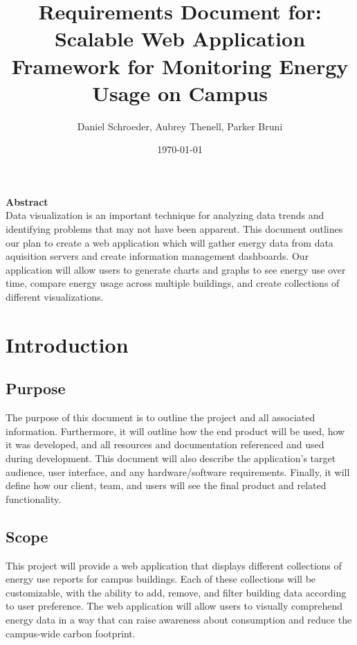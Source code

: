 \documentclass[journal,10pt,onecolumn,compsoc]{IEEEtran}
\title{Requirements Document for: \linebreak Scalable Web Application Framework for Monitoring Energy Usage on Campus}
\author{Daniel Schroeder, Aubrey Thenell, Parker Bruni}
\date{\today}
\begin{document}
    \maketitle
    \vfill
    \noindent \textbf{Abstract} \\
                \indent 
                Data visualization is an important technique for analyzing data trends and identifying problems that may not have been apparent. This document outlines our plan to create a web application which will gather energy data from data aquisition servers and create information management dashboards. Our application will allow users to generate charts and graphs to see energy use over time, compare energy usage across multiple buildings, and create collections of different visualizations.
                
                
    
    \newpage
    \tableofcontents
    \clearpage
    
    \section{Introduction}
    \subsection{Purpose}
	The purpose of this document is to outline the project and all associated information. Furthermore, it will outline how the end product will be used, how it was developed, and all resources and documentation referenced and used during development. This document will also describe the application’s target audience, user interface, and any hardware/software requirements. Finally, it will define how our client, team, and users will see the final product and related functionality.
    \subsection{Scope}
    This project will provide a web application that displays different collections of energy use reports for campus buildings. Each of these collections will be customizable, with the ability to add, remove, and filter building data according to user preference. The web application will allow users to visually comprehend energy data in a way that can raise awareness about consumption and reduce the campus-wide carbon footprint.
    
\end{document}
